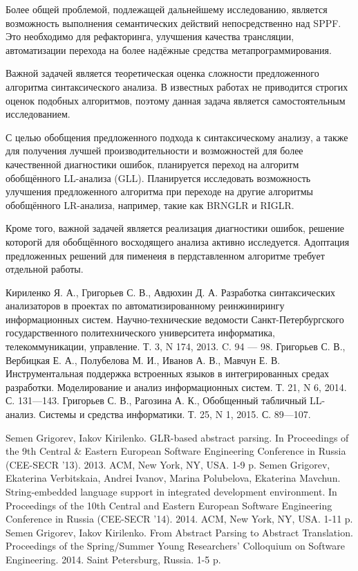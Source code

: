 Более общей проблемой, подлежащей дальнейшему исследованию, является возможность выполнения семантических действий непосредственно над SPPF. Это необходимо для рефакторинга, улучшения качества трансляции, автоматизации перехода на более надёжные средства метапрограммирования.

Важной задачей является теоретическая оценка сложности предложенного алгоритма синтаксического анализа. В известных работах не приводится строгих оценок подобных алгоритмов, поэтому данная задача является самостоятельным исследованием.

С целью обобщения предложенного подхода к синтаксическому анализу, а также для получения лучшей производительности и возможностей для более качественной диагностики ошибок, планируется переход на алгоритм обобщённого LL-анализа (GLL). Планируется исследовать возможность улучшения предложенного алгоритма при переходе на другие алгоритмы обобщённого LR-анализа, например, такие как BRNGLR и RIGLR.

Кроме того, важной задачей является реализация диагностики ошибок, решение которогй для обобщённого восходящего анализа активно исследуется. Адоптация предложенных решений для пименеия в пердставленном алгоритме требует отдельной работы.


\newpage
\renewcommand{\refname}{\Large Публикации автора по теме диссертации}
%

\begin{thebibliography}{99}

 Кириленко Я. А., Григорьев С. В., Авдюхин Д. А. Разработка синтаксических анализаторов в проектах по автоматизированному реинжинирингу информационных систем. Научно-технические ведомости Санкт-Петербургского государственного политехнического университета информатика, телекоммуникации, управление. Т. 3, N 174, 2013. C. 94 --- 98.
 Григорьев С. В., Вербицкая Е. А., Полубелова М. И., Иванов А. В., Мавчун Е. В. Инструментальная поддержка встроенных языков в интегрированных средах разработки. Моделирование и анализ информационных систем. Т. 21, N 6, 2014. С. 131---143.
 Григорьев С. В., Рагозина А. К., Обобщенный табличный LL-анализ. Системы и средства информатики. Т. 25, N 1, 2015. С. 89---107. 

Semen Grigorev, Iakov Kirilenko. GLR-based abstract parsing. In Proceedings of the 9th Central \& Eastern European Software Engineering Conference in Russia (CEE-SECR ’13). 2013. ACM, New York, NY, USA. 1-9 p.
Semen Grigorev, Ekaterina Verbitskaia, Andrei Ivanov, Marina Polubelova, Ekaterina Mavchun. String-embedded language support in integrated development environment. In Proceedings of the 10th Central and Eastern European Software Engineering Conference in Russia (CEE-SECR '14). 2014. ACM, New York, NY, USA. 1-11 p.
Semen Grigorev, Iakov Kirilenko. From Abstract Parsing to Abstract Translation. Proceedings of the Spring/Summer Young Researchers' Colloquium on Software Engineering. 2014. Saint Petersburg, Russia. 1-5 p.

\end{thebibliography}
